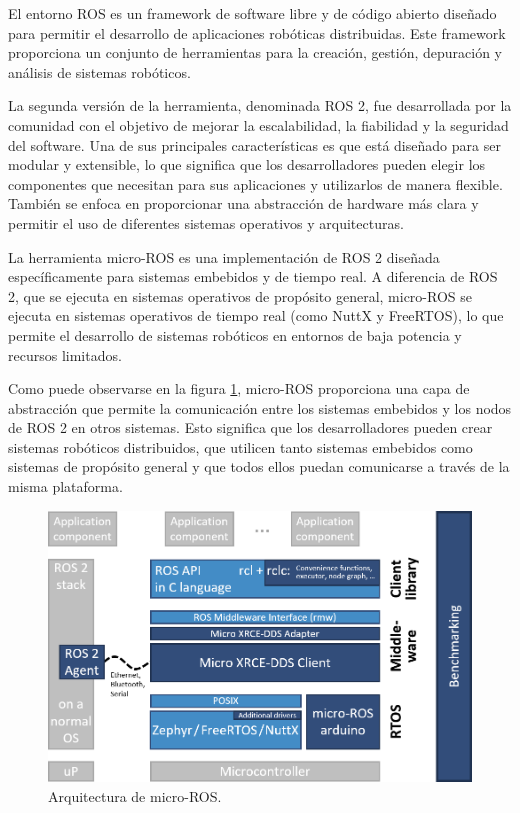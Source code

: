 \documentclass[
11pt, %
codirector, %
]{charter}
\begin{document}
El entorno ROS es un framework de software libre y de código abierto diseñado para permitir el desarrollo de aplicaciones robóticas distribuidas. Este framework proporciona un conjunto de herramientas para la creación, gestión, depuración y análisis de sistemas robóticos.

La segunda versión de la herramienta, denominada ROS 2, fue desarrollada por la comunidad con el objetivo de mejorar la escalabilidad, la fiabilidad y la seguridad del software.
Una de sus principales características es que está diseñado para ser modular y extensible, lo que significa que los desarrolladores pueden elegir los componentes que necesitan para sus aplicaciones y utilizarlos de manera flexible. 
También se enfoca en proporcionar una abstracción de hardware más clara y permitir el uso de diferentes sistemas operativos y arquitecturas. 

La herramienta micro-ROS es una implementación de ROS 2 diseñada específicamente para sistemas embebidos y de tiempo real. A diferencia de ROS 2, que se ejecuta en sistemas operativos de propósito general, micro-ROS se ejecuta en sistemas operativos de tiempo real (como NuttX y FreeRTOS), lo que permite el desarrollo de sistemas robóticos en entornos de baja potencia y recursos limitados.

Como puede observarse en la figura \ref{fig:microROSarch}, micro-ROS proporciona una capa de abstracción que permite la comunicación entre los sistemas embebidos y los nodos de ROS 2 en otros sistemas.
Esto significa que los desarrolladores pueden crear sistemas robóticos distribuidos, que utilicen tanto sistemas embebidos como sistemas de propósito general y que todos ellos puedan comunicarse a través de la misma plataforma.

\begin{figure}[htpb]
\centering 
\includegraphics[width=.7\textwidth]{./Figuras/micro-ROS_architecture.png}
\caption{Arquitectura de micro-ROS.}
\label{fig:microROSarch}
\end{figure}
\end{document}
